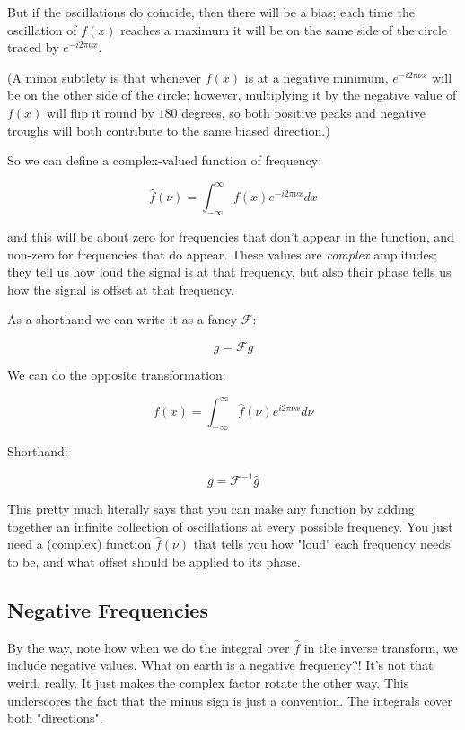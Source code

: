 But if the oscillations do coincide, then there will be a bias; each time the oscillation of $f(x)$ reaches a maximum it will be on the same side of the circle traced by $e^{-i2\pi\nu x}$.

(A minor subtlety is that whenever $f(x)$ is at a negative minimum, $e^{-i2\pi\nu x}$ will be on the other side of the circle; however, multiplying it by the negative value of $f(x)$ will flip it round by $180$ degrees, so both positive peaks and negative troughs will both contribute to the same biased direction.)

So we can define a complex-valued function of frequency:

\begin{equation}
    \hat{f}(\nu) = \int_{-\infty}^{\infty} f(x)e^{-i2\pi\nu x} dx
    \label{eq:fourier}
\end{equation}

and this will be about zero for frequencies that don't appear in the function, and non-zero for frequencies that do appear. These values are \textit{complex} amplitudes; they tell us how loud the signal is at that frequency, but also their phase tells us how the signal is offset at that frequency.

As a shorthand we can write it as a fancy $\mathcal{F}$:

$$\hat{g} = \mathcal{F} g$$

We can do the opposite transformation:

\begin{equation}    
f(x) = \int_{-\infty}^{\infty} \hat{f}(\nu)e^{i2\pi\nu x} d\nu
\label{eq:invfourier}
\end{equation}

Shorthand:

$$g = \mathcal{F}^{-1} \hat{g}$$

This pretty much literally says that you can make any function by adding together an infinite collection of oscillations at every possible frequency. You just need a (complex) function $\hat{f}(\nu)$ that tells you how "loud" each frequency needs to be, and what offset should be applied to its phase.

\subsection{Negative Frequencies}

By the way, note how when we do the integral over $\hat{f}$ in the inverse transform, we include negative values. What on earth is a negative frequency?! It's not that weird, really. It just makes the complex factor rotate the other way. This underscores the fact that the minus sign is just a convention. The integrals cover both "directions".

